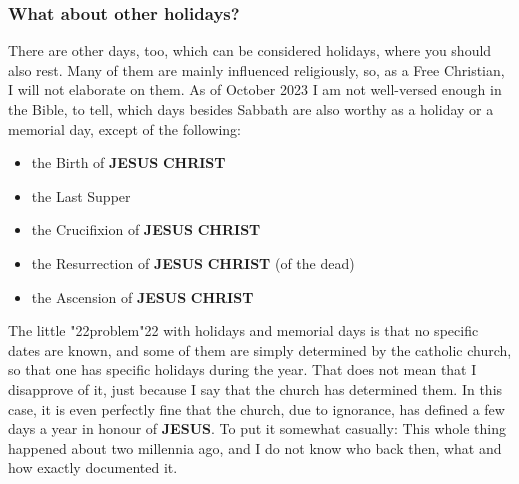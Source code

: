 \documentclass[12pt,a5paper]{article}
\newcommand{\Christ}[0]{\textbf{CHRIST}}
\newcommand{\Jesus}[0]{\textbf{JESUS}}
\newcommand{\q}[1]{\char"22{#1}\char"22 }
\begin{document}
	\subsubsection{What about other holidays?}
		There are other days,
		too,
		which can be considered holidays,
		where you should also rest.
		Many of them are mainly influenced religiously,
		so,
		as a Free Christian,
		I will not elaborate on them.
		As of October 2023 I am not well-versed enough in the Bible,
		to tell,
		which days besides Sabbath are also worthy as a holiday
		or a memorial day,
		except of the following:
		\begin{itemize}[noitemsep]
			\item the Birth of {\Jesus} {\Christ}
			\item the Last Supper
			\item the Crucifixion of {\Jesus} {\Christ}
			\item the Resurrection of {\Jesus} {\Christ} (of the dead)
			\item the Ascension of {\Jesus} {\Christ}
		\end{itemize}
		The little \q{problem} with holidays and memorial days is that no specific dates are known,
		and some of them are simply determined by the catholic church,
		so that one has specific holidays during the year.
		That does not mean that I disapprove of it,
		just because I say that the church has determined them.
		In this case,
		it is even perfectly fine that the church,
		due to ignorance,
		has defined a few days a year in honour of {\Jesus}.
		To put it somewhat casually:
		This whole thing happened about two millennia ago,
		and I do not know
		who back then,
		what and how exactly documented it.
\end{document}
